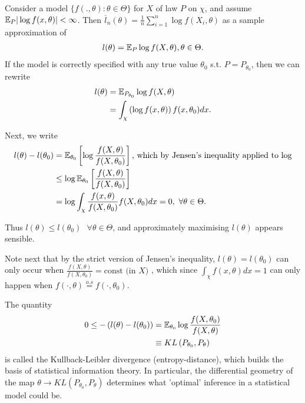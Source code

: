 \documentclass[a4paper]{article}
\begin{document}
\begin{observation}[1]
	Consider a model $\{f(., \theta) : \theta \in \Theta\}$ for $X$ of law $P$ on $\chi$, and assume $\mathbb{E}_{P} |\log f(x, \theta)| < \infty$. Then $\overline{l}_{n}(\theta) = \frac{1}{n}\sum_{i=1}^{n}\log f(X_{i}, \theta)$ as a sample approximation of
	\begin{align*}
		l(\theta) = \mathbb{E}_{P} \log f(X, \theta), \theta \in \Theta
	.\end{align*}
	If the model is correctly specified with any true value $\theta_{0}$ s.t. $P=P_{\theta_{0}}$, then we can rewrite
	\begin{align*}
		l(\theta) &= \mathbb{E}_{P_{\theta_{0}}} \log f(X, \theta) \\
		&= \int_{\chi} \left(\log f(x, \theta) \right) f(x, \theta_{0}) dx
	.\end{align*}

	Next, we write 
	\begin{align*}
		l(\theta) - l(\theta_{0}) &= \mathbb{E}_{\theta_{0}}\left[ \log \frac{f(X, \theta)}{f(X, \theta_{0})} \right] \text{, which by Jensen's inequality applied to log} \\
		&\le \log \mathbb{E}_{\theta_{0}}\left[ \frac{f(X, \theta)}{f(X, \theta_{0})} \right] \\
		&= \log \int_{\chi} \frac{f(x, \theta)}{f(X, \theta_{0})} f(X, \theta_{0}) dx = 0,\text{ } \forall \theta \in  \Theta
	.\end{align*}

	Thus $l(\theta) \le l(\theta_{0}) \text{ }\forall \theta \in \Theta$, and approximately maximising $l(\theta)$ appears sensible.

	Note next that by the strict version of Jensen's inequality,  $l(\theta) = l(\theta_{0})$ can only occur when $\frac{f(X, \theta)}{f(X, \theta_{0})} = \text{const (in $X$) }$, which since $\int_{\chi} f(x, \theta) dx = 1$ can only happen when $f(\cdot , \theta) \stackrel{o.s}{=} f(\cdot , \theta_{0})$.
\end{observation}

The quantity 
\begin{align*}
	0 \le  -\left( l(\theta) - l(\theta_{0}) \right) &= \mathbb{E}_{\theta_{0}} \log \frac{f(X, \theta_{0})}{f(X, \theta)} \\
	&\equiv KL\left( P_{\theta_{0}}, P_{\theta} \right) 
\end{align*}
is called the Kullback-Leibler divergence (entropy-distance), which builds the basis of statistical information theory. In particular, the differential geometry of the map $\theta \to KL\left( P_{\theta_{0}}, P_{\theta} \right)$ determines what 'optimal' inference in a statistical model could be.
\end{document}
